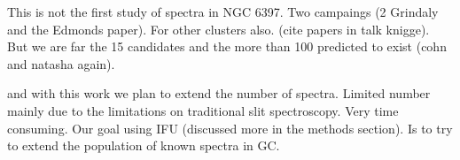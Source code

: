 This is not the first study of spectra in NGC 6397. Two campaings (2 Grindaly and the Edmonds paper). For other clusters also. (cite papers in talk knigge). But we are far the 15 candidates and the more than 100 predicted to exist (cohn and natasha again). 

and with this work we plan to extend the number of spectra. Limited number mainly due to the limitations on traditional slit spectroscopy. Very time consuming.  Our goal using IFU (discussed more in the methods section). Is to try to extend the population of known spectra in GC.  


%

\clearpage



\thispagestyle{empty}


